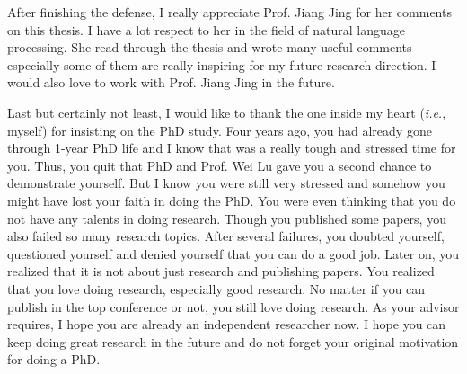 \documentclass[
11pt, %
oneside, %
english, %
singlespacing, %
headsepline, %
]{MastersDoctoralThesis} %
\begin{document}
\begin{acknowledgements}
After finishing the defense, I really appreciate Prof. Jiang Jing for her comments on this thesis. 
I have a lot respect to her in the field of natural language processing. 
She read through the thesis and wrote many useful comments especially some of them are really inspiring for my future research direction. 
I would also love to work with Prof. Jiang Jing in the future. 

Last but certainly not least, I would like to thank the one inside my heart (\textit{i.e.}, myself) for insisting on the PhD study. 
Four years ago, you had already gone through 1-year PhD life and I know that was a really tough and stressed time for you.
Thus, you quit that PhD and Prof. Wei Lu gave you a second chance to demonstrate yourself. 
But I know you were still very stressed and somehow you might have lost your faith in doing the PhD. 
You were even thinking that you do not have any talents in doing research. 
Though you published some papers, you also failed so many research topics. 
After several failures, you doubted yourself, questioned yourself and denied yourself that you can do a good job. 
Later on, you realized that it is not about just research and publishing papers. 
You realized that you love doing research, especially good research.
No matter if you can publish in the top conference or not, you still love doing research. 
As your advisor requires, I hope  you are already an independent researcher now. 
I hope you can keep doing great research in the future and do not forget your original motivation for doing a PhD.








\end{acknowledgements}


\tableofcontents %

\listoffigures %

\listoftables %

\end{document}
